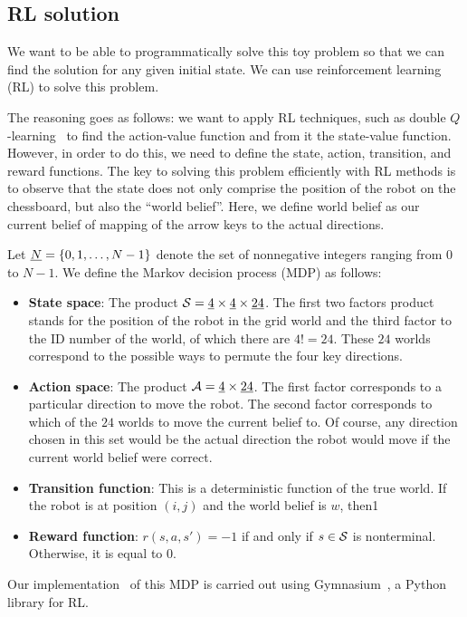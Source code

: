 \subsection{RL solution}
\label{ssec:rl_sol}
%
We want to be able to programmatically solve this toy problem so that we can 
find the solution for any given initial state. We can use reinforcement learning
(RL) to solve this problem. 

The reasoning goes as follows: we want to apply RL techniques, such as double
$Q$-learning~\cite{morales2020grokking} to find the action-value function and
from it the state-value function. However, in order to do this, we need to
define the state, action, transition, and reward functions. The key to solving 
this problem efficiently with RL methods is to observe that the state does not 
only comprise the position of the robot on the chessboard, but also the ``world 
belief''. Here, we define world belief as our current belief of mapping of the 
arrow keys to the actual directions.

Let $\uline{N} = \{0, 1, \ldots, N-1\}$ denote the set of nonnegative integers
ranging from $0$ to $N-1$. We define the Markov decision process (MDP) as
follows:

\begin{itemize}
\item \textbf{State space}: The product $\mc{S} = \uline{4} \times \uline{4}
\times \uline{24}$. The first two factors product stands for the position of the
robot in the grid world and the third factor to the ID number of the world, of
which there are $4! = 24$. These $24$ worlds correspond to the possible ways to
permute the four key directions.
\item \textbf{Action space}: The product $\mc{A} = \uline{4} \times \uline{24}$.
The first factor corresponds to a particular direction to move the robot. The
second factor corresponds to which of the $24$ worlds to move the current belief
to. Of course, any direction chosen in this set would be the actual direction
the robot would move if the current world belief were correct.
\item \textbf{Transition function}: This is a deterministic function of the true
world. If the robot is at position $(i, j)$ and the world belief is $w$, then1
\item \textbf{Reward function}: $r(s, a, s') = -1$ if and only if $s \in \mathcal{S}$
is nonterminal. Otherwise, it is equal to $0$.
\end{itemize}

Our implementation~\cite{saticiGitHub} of this MDP is carried out using 
Gymnasium~\cite{towers2024gymnasium}, a Python library for RL.